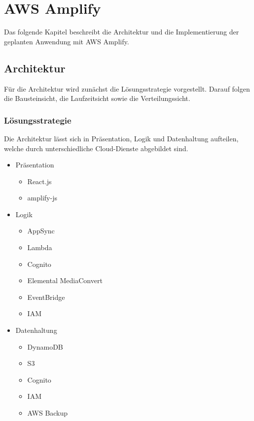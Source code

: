 \chapter{AWS Amplify}

Das folgende Kapitel beschreibt die Architektur und die Implementierung der geplanten Anwendung mit AWS Amplify.

\section{Architektur}

Für die Architektur wird zunächst die Lösungsstrategie vorgestellt. Darauf folgen die Bausteinsicht, die Laufzeitsicht sowie die Verteilungssicht.

\subsection{Lösungsstrategie}

Die Architektur lässt sich in Präsentation, Logik und Datenhaltung aufteilen, welche durch unterschiedliche Cloud-Dienste abgebildet sind.
\begin{itemize}
  \item Präsentation
    \begin{itemize}
      \item React.js
      \item amplify-js
    \end{itemize}
  \item Logik
    \begin{itemize}
      \item AppSync
      \item Lambda
      \item Cognito
      \item Elemental MediaConvert
      \item EventBridge
      \item IAM
    \end{itemize}
  \item Datenhaltung
    \begin{itemize}
      \item DynamoDB
      \item S3
      \item Cognito
      \item IAM
      \item AWS Backup
    \end{itemize}
\end{itemize}

